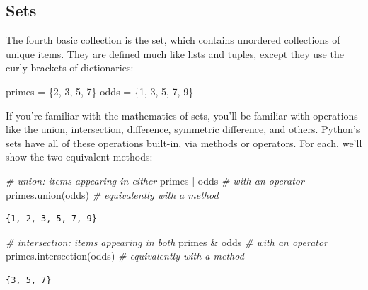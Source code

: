 \documentclass[]{article}
\newenvironment{Shaded}{}{}
\newcommand{\DecValTok}[1]{\textcolor[rgb]{0.25,0.63,0.44}{{#1}}}
\newcommand{\CommentTok}[1]{\textcolor[rgb]{0.38,0.63,0.69}{\textit{{#1}}}}
\newcommand{\OperatorTok}[1]{\textcolor[rgb]{0.40,0.40,0.40}{{#1}}}
\newcommand{\NormalTok}[1]{{#1}}
\begin{document}
\subsection{Sets}\label{sets}

The fourth basic collection is the set, which contains unordered
collections of unique items. They are defined much like lists and
tuples, except they use the curly brackets of dictionaries:

\begin{Shaded}
\begin{Highlighting}[]
\NormalTok{primes }\OperatorTok{=} \NormalTok{\{}\DecValTok{2}\NormalTok{, }\DecValTok{3}\NormalTok{, }\DecValTok{5}\NormalTok{, }\DecValTok{7}\NormalTok{\}}
\NormalTok{odds }\OperatorTok{=} \NormalTok{\{}\DecValTok{1}\NormalTok{, }\DecValTok{3}\NormalTok{, }\DecValTok{5}\NormalTok{, }\DecValTok{7}\NormalTok{, }\DecValTok{9}\NormalTok{\}}
\end{Highlighting}
\end{Shaded}

If you're familiar with the mathematics of sets, you'll be familiar with
operations like the union, intersection, difference, symmetric
difference, and others. Python's sets have all of these operations
built-in, via methods or operators. For each, we'll show the two
equivalent methods:

\begin{Shaded}
\begin{Highlighting}[]
\CommentTok{# union: items appearing in either}
\NormalTok{primes }\OperatorTok{|} \NormalTok{odds      }\CommentTok{# with an operator}
\NormalTok{primes.union(odds) }\CommentTok{# equivalently with a method}
\end{Highlighting}
\end{Shaded}

\begin{verbatim}
{1, 2, 3, 5, 7, 9}
\end{verbatim}

\begin{Shaded}
\begin{Highlighting}[]
\CommentTok{# intersection: items appearing in both}
\NormalTok{primes }\OperatorTok{&} \NormalTok{odds             }\CommentTok{# with an operator}
\NormalTok{primes.intersection(odds) }\CommentTok{# equivalently with a method}
\end{Highlighting}
\end{Shaded}

\begin{verbatim}
{3, 5, 7}
\end{verbatim}
\end{document}
